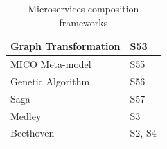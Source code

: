 \documentclass{article}
\begin{document}
\begin{multicols}{2}
\begin{table}[ht!]
\begin{center}
\begin{tabular}{ | m{20em} | m{20em} | }
Graph   Transformation                       & S53                                        \\ \hline
MICO   Meta-model                            & S55                                        \\ \hline
Genetic   Algorithm                          & S56                                        \\ \hline
Saga                                         & S57                                        \\ \hline
Medley                                       & S3                                         \\ \hline
Beethoven                                    & S2, S4                                     \\ \hline
\end{tabular}
\end{center}
\caption{Microservices composition frameworks}
\label{table:2}
\end{table}


\end{multicols}
\end{document}
